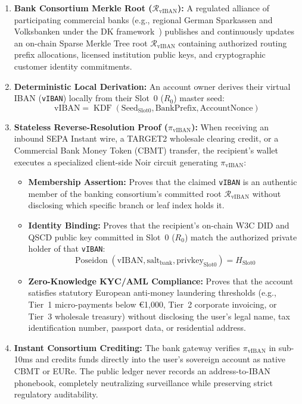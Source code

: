 \documentclass[a4paper,11pt,twoside,parskip=half-,headings=small]{scrartcl}
\newcommand{\code}[1]{\texttt{#1}}
\begin{document}
\begin{enumerate}
  \item \textbf{Bank Consortium Merkle Root ($\mathcal{R}_{\text{vIBAN}}$):} A regulated alliance of participating commercial banks (e.g., regional German Sparkassen and Volksbanken under the DK framework~\cite{dk2023cbmt}) publishes and continuously updates an on-chain Sparse Merkle Tree root $\mathcal{R}_{\text{vIBAN}}$ containing authorized routing prefix allocations, licensed institution public keys, and cryptographic customer identity commitments.
  \item \textbf{Deterministic Local Derivation:} An account owner derives their virtual IBAN (\code{vIBAN}) locally from their Slot~0 ($R_0$) master seed:
  \begin{equation}
    \text{vIBAN} = \operatorname{KDF}(\text{Seed}_{\text{Slot0}}, \text{BankPrefix}, \text{AccountNonce})
  \end{equation}
  \item \textbf{Stateless Reverse-Resolution Proof ($\pi_{\text{vIBAN}}$):} When receiving an inbound SEPA Instant wire, a TARGET2 wholesale clearing credit, or a Commercial Bank Money Token (CBMT) transfer, the recipient's wallet executes a specialized client-side Noir circuit generating $\pi_{\text{vIBAN}}$:
  \begin{itemize}
    \item \textbf{Membership Assertion:} Proves that the claimed \code{vIBAN} is an authentic member of the banking consortium's committed root $\mathcal{R}_{\text{vIBAN}}$ without disclosing which specific branch or leaf index holds it.
    \item \textbf{Identity Binding:} Proves that the recipient's on-chain W3C DID and QSCD public key committed in Slot~0 ($R_0$) match the authorized private holder of that \code{vIBAN}:
    \begin{equation}
      \operatorname{Poseidon}(\text{vIBAN}, \text{salt}_{\text{bank}}, \text{privkey}_{\text{Slot0}}) = H_{\text{Slot0}}
    \end{equation}
    \item \textbf{Zero-Knowledge KYC/AML Compliance:} Proves that the account satisfies statutory European anti-money laundering thresholds (e.g., Tier~1 micro-payments below €1,000, Tier~2 corporate invoicing, or Tier~3 wholesale treasury) without disclosing the user's legal name, tax identification number, passport data, or residential address.
  \end{itemize}
  \item \textbf{Instant Consortium Crediting:} The bank gateway verifies $\pi_{\text{vIBAN}}$ in sub-10ms and credits funds directly into the user's sovereign account as native CBMT or EURe. The public ledger never records an address-to-IBAN phonebook, completely neutralizing surveillance while preserving strict regulatory auditability.
\end{enumerate}
\end{document}
